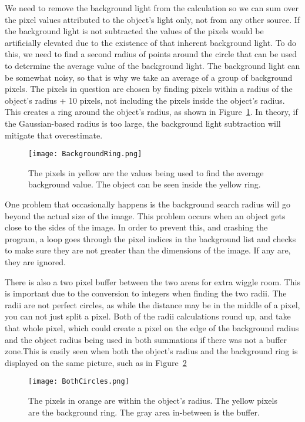 We need to remove the background light from the calculation so we can sum over the pixel values attributed to the object's light only, not from any other source. If the background light is not subtracted the values of the pixels would be artificially elevated due to the existence of that inherent background light. To do this, we need to find a second radius of points around the circle that can be used to determine the average value of the background light. The background light can be somewhat noisy, so that is why we take an average of a group of background pixels. The pixels in question are chosen by finding pixels within a radius of the object's radius + 10 pixels, not including the pixels inside the object's radius. This creates a ring around the object's radius, as shown in Figure~\ref{fig:background}. In theory, if the Gaussian-based radius is too large, the background light subtraction will mitigate that overestimate.

\begin{figure}[ht!]
	\centering
	\texttt{[image: BackgroundRing.png]}
	\caption{The pixels in yellow are the values being used to find the average background value. The object can be seen inside the yellow ring.}
	\label{fig:background}
\end{figure}

One problem that occasionally happens is the background search radius will go beyond the actual size of the image. This problem occurs when an object gets close to the sides of the image. In order to prevent this, and crashing the program, a loop goes through the pixel indices in the background list and checks to make sure they are not greater than the dimensions of the image. If any are, they are ignored. 

There is also a two pixel buffer between the two areas for extra wiggle room. This is important due to the conversion to integers when finding the two radii. The radii are not perfect circles, as while the distance may be in the middle of a pixel, you can not just split a pixel. Both of the radii calculations round up, and take that whole pixel, which could create a pixel on the edge of the background radius and the object radius being used in both summations if there was not a buffer zone.This is easily seen when both the object's radius and the background ring is displayed on the same picture, such as in Figure~\ref{fig:BothCircles} 

\begin{figure}[ht!]
	\centering
	\texttt{[image: BothCircles.png]}
	\caption{The pixels in orange are within the object's radius. The yellow pixels are the background ring. The gray area in-between is the buffer.}
	\label{fig:BothCircles}
\end{figure}

